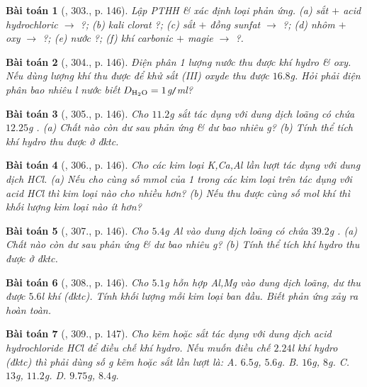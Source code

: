 \documentclass{article}
\newtheorem{baitoan}{Bài toán}
\begin{document}
\begin{baitoan}[\cite{An_400_BT_Hoa_Hoc_8_2020}, 303., p. 146]
	Lập PTHH \& xác định loại phản ứng. (a) sắt $+$ acid hydrochloric $\to$ ?; (b) kali clorat \ce{->[$t^\circ$]} ?; (c) sắt $+$ đồng sunfat $\to$ ?; (d) nhôm $+$ oxy $\to$ ?; (e) nước  ?; (f) khí carbonic $+$ magie $\to$ ?.
\end{baitoan}

\begin{baitoan}[\cite{An_400_BT_Hoa_Hoc_8_2020}, 304., p. 146]
	Điện phân 1 lượng nước thu được khí hydro \& oxy. Nếu dùng lượng khí \emph{} thu được để khử sắt (III) oxyde thu được $16.8$\emph{g}. Hỏi phải điện phân bao nhiêu \emph{l} nước biết $D_{\ce{H2O}} = 1$\emph{g\texttt{/}ml}?
\end{baitoan}

\begin{baitoan}[\cite{An_400_BT_Hoa_Hoc_8_2020}, 305., p. 146]
	Cho $11.2$\emph{g} sắt tác dụng với dung dịch \emph{} loãng có chứa $12.25$\emph{g }. (a) Chất nào còn dư sau phản ứng \& dư bao nhiêu \emph{g}? (b) Tính thể tích khí hydro thu được ở đktc.
\end{baitoan}

\begin{baitoan}[\cite{An_400_BT_Hoa_Hoc_8_2020}, 306., p. 146]
	Cho các kim loại \emph{K,Ca,Al} lần lượt tác dụng với dung dịch \emph{HCl}. (a) Nếu cho cùng số mmol của 1 trong các kim loại trên tác dụng với acid \emph{HCl} thì kim loại nào cho nhiều \emph{} hơn? (b) Nếu thu được cùng số mol khí \emph{} thì khối lượng kim loại nào ít hơn?
\end{baitoan}

\begin{baitoan}[\cite{An_400_BT_Hoa_Hoc_8_2020}, 307., p. 146]
	Cho $5.4$\emph{g Al} vào dung dịch \emph{} loãng có chứa $39.2$\emph{g }. (a) Chất nào còn dư sau phản ứng \& dư bao nhiêu \emph{g}? (b) Tính thể tích khí hydro thu được ở đktc.
\end{baitoan}

\begin{baitoan}[\cite{An_400_BT_Hoa_Hoc_8_2020}, 308., p. 146]
	Cho $5.1$\emph{g} hỗn hợp \emph{Al,Mg} vào dung dịch \emph{} loãng, dư thu được $5.6$\emph{l} khí \emph{} (đktc). Tính khối lượng mỗi kim loại ban đầu. Biết phản ứng xảy ra hoàn toàn.
\end{baitoan}

\begin{baitoan}[\cite{An_400_BT_Hoa_Hoc_8_2020}, 309., p. 147]
	Cho kẽm hoặc sắt tác dụng với dung dịch acid hydrochloride \emph{HCl} để điều chế khí hydro. Nếu muốn điều chế $2.24$\emph{l} khí hydro (đktc) thì phải dùng số \emph{g} kẽm hoặc sắt lần lượt là: {\sf A.} $6.5$\emph{g}, $5.6$\emph{g}. {\sf B.} $16$\emph{g}, $8$\emph{g}. {\sf C.} $13$\emph{g}, $11.2$\emph{g}. {\sf D.} $9.75$\emph{g}, $8.4$\emph{g}.
\end{baitoan}
\end{document}
